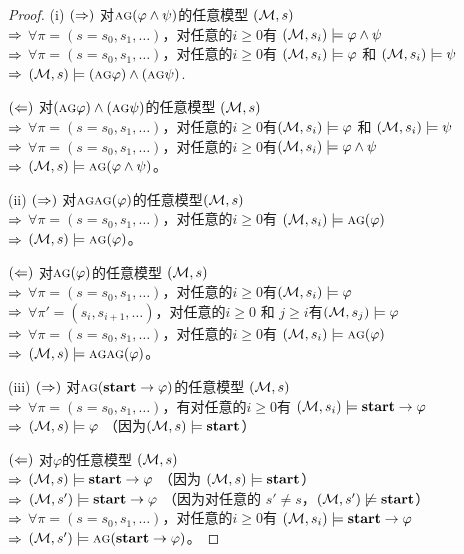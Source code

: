 \begin{proof}
	(i) $(\Rightarrow)$ 对$\textsc{a}\textsc{g} (\varphi\land\psi)$的任意模型 $({\cal M}, s)$\\
	$\Rightarrow$ $\forall \pi=(s=s_0, s_1, \dots)$，对任意的$i\geq 0$有 $({\cal M},s_i) \models \varphi \wedge \psi$\\
	$\Rightarrow$ $\forall \pi=(s=s_0, s_1, \dots)$，对任意的$i\geq 0$有 $({\cal M},s_i) \models \varphi$ 和 $({\cal M},s_i) \models \psi$\\
	$\Rightarrow$ $({\cal M},s) \models (\textsc{a}\textsc{g} \varphi) \land (\textsc{a}\textsc{g}\psi)$.
	
	$(\Leftarrow)$ 对$(\textsc{a}\textsc{g} \varphi) \land (\textsc{a}\textsc{g}\psi)$的任意模型 $({\cal M},s)$\\
	$\Rightarrow$ $\forall \pi=(s=s_0, s_1, \dots)$，对任意的$i\geq 0$有$({\cal M},s_i) \models \varphi$ 和 $({\cal M},s_i) \models \psi$\\
	$\Rightarrow$ $\forall \pi=(s=s_0, s_1, \dots)$，对任意的$i\geq 0$有$({\cal M},s_i) \models \varphi \wedge \psi$ \\
	$\Rightarrow$ $({\cal M}, s) \models \textsc{a}\textsc{g} (\varphi\land\psi)$。
	
	(ii) $(\Rightarrow)$ 对$\textsc{a}\textsc{g} \textsc{a}\textsc{g} (\varphi)$的任意模型$({\cal M}, s)$ \\
	$\Rightarrow$ $\forall \pi=(s=s_0, s_1, \dots)$，对任意的$i\geq 0$有 $({\cal M},s_i) \models \textsc{a}\textsc{g} (\varphi)$\\
	$\Rightarrow$ $({\cal M},s) \models \textsc{a}\textsc{g} (\varphi)$。

	$(\Leftarrow)$ 对$\textsc{a}\textsc{g} (\varphi)$的任意模型 $({\cal M}, s)$\\
	$\Rightarrow$ $\forall \pi=(s=s_0, s_1, \dots)$，对任意的$i\geq 0$有$({\cal M},s_i) \models \varphi$ \\
	$\Rightarrow$ $\forall \pi'=(s_i, s_{i+1}, \dots)$，对任意的$i\geq 0$ 和 $j \geq i$有$({\cal M},s_j) \models \varphi$ \\
	$\Rightarrow$ $\forall \pi=(s=s_0, s_1, \dots)$，对任意的$i\geq 0$有 $({\cal M},s_i) \models \textsc{a}\textsc{g} (\varphi)$ \\ 
	$\Rightarrow$ $({\cal M},s) \models\textsc{a}\textsc{g} \textsc{a}\textsc{g} (\varphi)$。
	
	(iii) $(\Rightarrow)$ 对$\textsc{a}\textsc{g} (\textbf{start} \rightarrow\varphi)$的任意模型 $({\cal M},s)$ \\
	$\Rightarrow$ $\forall \pi=(s=s_0, s_1, \dots)$，有对任意的$i\geq 0$有 $({\cal M},s_i) \models \textbf{start} \rightarrow\varphi$\\
	$\Rightarrow$ $({\cal M},s) \models \varphi$ （因为$({\cal M},s) \models \textbf{start}$）
	
	$(\Leftarrow)$ 对$\varphi$的任意模型 $({\cal M}, s)$\\
	$\Rightarrow$ $({\cal M},s) \models \textbf{start}\rightarrow \varphi$ （因为 $({\cal M},s) \models \textbf{start}$）\\
	$\Rightarrow$ $({\cal M},s') \models \textbf{start}\rightarrow \varphi$ （因为对任意的 $s'\not = s$，$({\cal M},s') \not \models \textbf{start}$）\\
	$\Rightarrow$ $\forall \pi=(s=s_0, s_1, \dots)$，对任意的$i\geq 0$有 $({\cal M},s_i) \models \textbf{start} \rightarrow\varphi$ \\ 
	$\Rightarrow$ $({\cal M},s') \models \textsc{a}\textsc{g} (\textbf{start} \rightarrow\varphi)$。
\end{proof}

